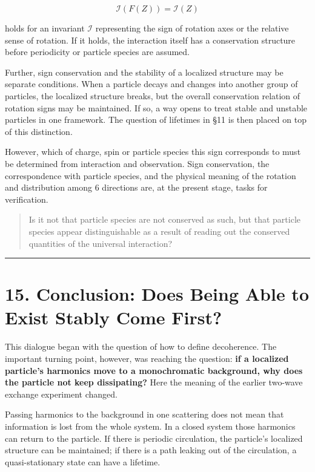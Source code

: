 \documentclass[
  a4paper,
]{article}
\begin{document}
\[
\boxed{\mathcal I(F(Z))=\mathcal I(Z)}
\]

holds for an invariant \(\mathcal I\) representing the sign of rotation
axes or the relative sense of rotation. If it holds, the interaction
itself has a conservation structure before periodicity or particle
species are assumed.

Further, sign conservation and the stability of a localized structure
may be separate conditions. When a particle decays and changes into
another group of particles, the localized structure breaks, but the
overall conservation relation of rotation signs may be maintained. If
so, a way opens to treat stable and unstable particles in one framework.
The question of lifetimes in §11 is then placed on top of this
distinction.

However, which of charge, spin or particle species this sign corresponds
to must be determined from interaction and observation. Sign
conservation, the correspondence with particle species, and the physical
meaning of the rotation and distribution among 6 directions are, at the
present stage, tasks for verification.

\begin{quote}
Is it not that particle species are not conserved as such, but that
particle species appear distinguishable as a result of reading out the
conserved quantities of the universal interaction?
\end{quote}

\begin{center}\rule{0.5\linewidth}{0.5pt}\end{center}

\section{15. Conclusion: Does Being Able to Exist Stably Come
First?}\label{conclusion-does-being-able-to-exist-stably-come-first}

This dialogue began with the question of how to define decoherence. The
important turning point, however, was reaching the question: \textbf{if
a localized particle's harmonics move to a monochromatic background, why
does the particle not keep dissipating?} Here the meaning of the earlier
two-wave exchange experiment changed.

Passing harmonics to the background in one scattering does not mean that
information is lost from the whole system. In a closed system those
harmonics can return to the particle. If there is periodic circulation,
the particle's localized structure can be maintained; if there is a path
leaking out of the circulation, a quasi-stationary state can have a
lifetime.
\end{document}
